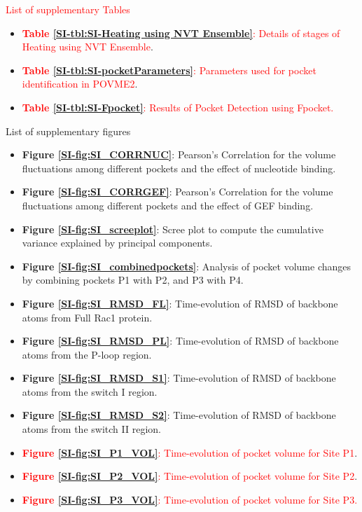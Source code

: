 \documentclass[12pt,a4paper]{achemso}
\begin{document}
\begin{suppinfo}

\textcolor{red}{List of supplementary Tables}
\begin{itemize}
 \item \textcolor{red}{\textbf{Table \ref{SI-tbl:SI-Heating using NVT Ensemble}}: Details of stages of Heating using NVT Ensemble}.
 \item \textcolor{red}{\textbf{Table \ref{SI-tbl:SI-pocketParameters}}: Parameters used for pocket identification in POVME2}.
 \item \textcolor{red}{\textbf{Table \ref{SI-tbl:SI-Fpocket}}: Results of Pocket Detection using Fpocket.}
\end{itemize}

List of supplementary figures
\begin{itemize}
    \item \textbf{Figure \ref{SI-fig:SI_CORRNUC}}: Pearson's Correlation for the volume fluctuations among different pockets and the effect of nucleotide binding.
    \item \textbf{Figure \ref{SI-fig:SI_CORRGEF}}: Pearson's Correlation for the volume fluctuations among different pockets and the effect of GEF binding.
    \item \textbf{Figure \ref{SI-fig:SI_screeplot}}: Scree plot to compute the cumulative variance explained by principal components.
    \item \textbf{Figure \ref{SI-fig:SI_combinedpockets}}: Analysis of pocket volume changes by combining pockets P1 with P2, and P3 with P4.
    \item \textbf{Figure \ref{SI-fig:SI_RMSD_FL}}: Time-evolution of RMSD of backbone atoms from Full Rac1 protein.
    \item \textbf{Figure \ref{SI-fig:SI_RMSD_PL}}: Time-evolution of RMSD of backbone atoms from the P-loop region.
    \item \textbf{Figure \ref{SI-fig:SI_RMSD_S1}}: Time-evolution of RMSD of backbone atoms from the switch I region.
    \item \textbf{Figure \ref{SI-fig:SI_RMSD_S2}}: Time-evolution of RMSD of backbone atoms from the switch II region.
    \item \textcolor{red}{\textbf{Figure \ref{SI-fig:SI_P1_VOL}}: Time-evolution of pocket volume for Site P1}.
    \item \textcolor{red}{\textbf{Figure \ref{SI-fig:SI_P2_VOL}}: Time-evolution of pocket volume for Site P2}.
    \item \textcolor{red}{\textbf{Figure \ref{SI-fig:SI_P3_VOL}}: Time-evolution of pocket volume for Site P3.}

\end{itemize}
\end{suppinfo}
\end{document}
